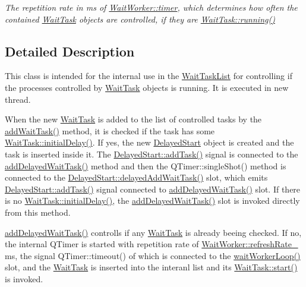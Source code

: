 \begin{DoxyCompactItemize}
\begin{DoxyCompactList}\small\item\em The repetition rate in ms of \hyperlink{class_wait_worker_a87df3552b89aad0db75385398426a9c9}{Wait\+Worker\+::timer}, which determines how often the contained \hyperlink{class_wait_task}{Wait\+Task} objects are controlled, if they are \hyperlink{class_wait_task_a39f09592449c61469d093f980a23cbfd}{Wait\+Task\+::running()} \end{DoxyCompactList}\end{DoxyCompactItemize}


\subsection{Detailed Description}
This class is intended for the internal use in the \hyperlink{class_wait_task_list}{Wait\+Task\+List} for controlling if the processes controlled by \hyperlink{class_wait_task}{Wait\+Task} objects is running. It is executed in new thread. 

When the new \hyperlink{class_wait_task}{Wait\+Task} is added to the list of controlled tasks by the \hyperlink{class_wait_worker_adaff9ea88795fa9d902711c1952828cd}{add\+Wait\+Task()} method, it is checked if the task has some \hyperlink{class_wait_task_a3984ae37eae1a984db2f2417df2bfbbf}{Wait\+Task\+::initial\+Delay()}. If yes, the new \hyperlink{class_delayed_start}{Delayed\+Start} object is created and the task is inserted inside it. The \hyperlink{class_delayed_start_ab12e84ab2900082373f556051f260c9c}{Delayed\+Start\+::add\+Task()} signal is connected to the \hyperlink{class_wait_worker_a71dec4dbc5a123f20d0a5a7f707ed5a3}{add\+Delayed\+Wait\+Task()} method and then the Q\+Timer\+::single\+Shot() method is connected to the \hyperlink{class_delayed_start_a579d849a61a9f20cb29bc18d5be7611a}{Delayed\+Start\+::delayed\+Add\+Wait\+Task()} slot, which emits \hyperlink{class_delayed_start_ab12e84ab2900082373f556051f260c9c}{Delayed\+Start\+::add\+Task()} signal connected to \hyperlink{class_wait_worker_a71dec4dbc5a123f20d0a5a7f707ed5a3}{add\+Delayed\+Wait\+Task()} slot. If there is no \hyperlink{class_wait_task_a3984ae37eae1a984db2f2417df2bfbbf}{Wait\+Task\+::initial\+Delay()}, the \hyperlink{class_wait_worker_a71dec4dbc5a123f20d0a5a7f707ed5a3}{add\+Delayed\+Wait\+Task()} slot is invoked directly from this method.

\hyperlink{class_wait_worker_a71dec4dbc5a123f20d0a5a7f707ed5a3}{add\+Delayed\+Wait\+Task()} controlls if any \hyperlink{class_wait_task}{Wait\+Task} is already beeing checked. If no, the internal Q\+Timer is started with repetition rate of \hyperlink{class_wait_worker_a088f21300ece1749e1e7e02a130275df}{Wait\+Worker\+::refresh\+Rate\+\_\+} ms, the signal Q\+Timer\+::timeout() of which is connected to the \hyperlink{class_wait_worker_a434d284c0e08697979b5c8c1a53fd529}{wait\+Worker\+Loop()} slot, and the \hyperlink{class_wait_task}{Wait\+Task} is inserted into the interanl list and its \hyperlink{class_wait_task_ab20934c4c6723db758564eef74eec5c4}{Wait\+Task\+::start()} is invoked.


